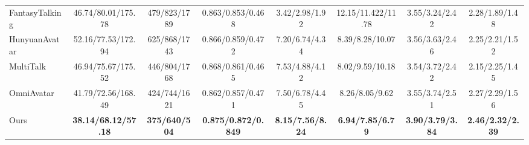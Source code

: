 \begin{table}[t!]
\begin{center}
{\begin{tabular}{l|ccccccc}
FantasyTalking~\cite{wang2025fantasytalking} & 46.74/80.01/175.78                     & 479/823/1789                     & 0.863/0.853/0.468                     & 3.42/2.98/1.92                     & 12.15/11.422/11.78                 & 3.55/3.24/2.42                     & 2.28/1.89/1.48                     \\
HunyuanAvatar~\cite{chen2025hunyuanvideo}  & 52.16/77.53/172.94                     & 625/868/1743                     & 0.866/0.859/0.472                     & 7.20/6.74/4.34                     & 8.39/8.28/10.07                    & 3.56/3.63/2.46                     & 2.25/2.21/1.52                     \\
MultiTalk~\cite{kong2025let}      & 46.94/75.67/175.52                     & 446/804/1768                     & 0.868/0.861/0.465                     & 7.53/4.88/4.12                     & 8.02/9.59/10.18                    & 3.54/3.72/2.42                     & 2.15/2.25/1.45                     \\
OmniAvatar~\cite{gan2025omniavatar}     & 41.79/72.56/168.49         & 424/744/1621         & 0.862/0.857/0.471          & 7.50/6.78/4.45          & 8.26/8.05/9.62          & 3.55/3.74/2.51          & 2.27/2.29/1.56 \\ \midrule
Ours           & \textbf{38.14/68.12/57.18}             & \textbf{375/640/504}             & \textbf{0.875/0.872/0.849}            & \textbf{8.15/7.56/8.24}            & \textbf{6.94/7.85/6.79}            & \textbf{3.90/3.79/3.84}            & \textbf{2.46/2.32/2.39}            \\ \bottomrule
\end{tabular}
}
\end{center}
\vspace{-0.3in}
\label{table:quantitative_comparisons}
\end{table}

